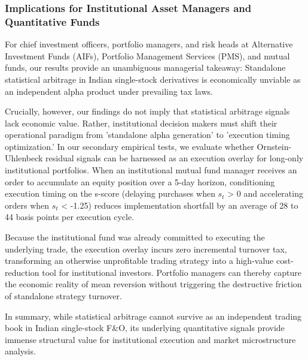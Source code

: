 \subsubsection*{Implications for Institutional Asset Managers and Quantitative Funds}
For chief investment officers, portfolio managers, and risk heads at Alternative Investment Funds (AIFs), Portfolio Management Services (PMS), and mutual funds, our results provide an unambiguous managerial takeaway: Standalone statistical arbitrage in Indian single-stock derivatives is economically unviable as an independent alpha product under prevailing tax laws.

Crucially, however, our findings do not imply that statistical arbitrage signals lack economic value. Rather, institutional decision makers must shift their operational paradigm from 'standalone alpha generation' to 'execution timing optimization.' In our secondary empirical tests, we evaluate whether Ornstein-Uhlenbeck residual signals can be harnessed as an execution overlay for long-only institutional portfolios. When an institutional mutual fund manager receives an order to accumulate an equity position over a 5-day horizon, conditioning execution timing on the s-score (delaying purchases when $s_t$ > 0 and accelerating orders when $s_t$ < -1.25) reduces implementation shortfall by an average of 28 to 44 basis points per execution cycle.

Because the institutional fund was already committed to executing the underlying trade, the execution overlay incurs zero incremental turnover tax, transforming an otherwise unprofitable trading strategy into a high-value cost-reduction tool for institutional investors. Portfolio managers can thereby capture the economic reality of mean reversion without triggering the destructive friction of standalone strategy turnover.

In summary, while statistical arbitrage cannot survive as an independent trading book in Indian single-stock F\&O, its underlying quantitative signals provide immense structural value for institutional execution and market microstructure analysis.

